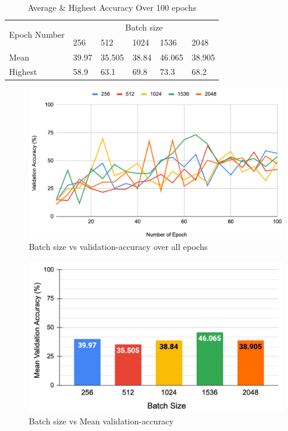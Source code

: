\documentclass[conference]{IEEEtran}
\begin{document}
\begin{table}
     \begin{tabular}{| m{0.75cm} | m{1cm}| m{1cm} | m{1cm} | m{1cm} | m{1cm} |}
     \hline
        \multirow{2}{3em}{Epoch Number} & \multicolumn{5}{|c|}{Batch size}\\ [1ex]
        \cline{2-6}
                     & 256 & 512 & 1024 & 1536 &  2048\\ [1ex]
        \hline\hline
                Mean & 39.97 & 35.505 & 38.84 & 46.065 & 38.905\\ [1ex]
        \hline
                Highest & 58.9 & 63.1 & 69.8 & 73.3 & 68.2\\ [1ex]
      \hline\hline
     \end{tabular}
\caption{\label{table:result_mean_high}Average \& Highest Accuracy Over 100 epochs}
\end{table}

\begin{figure}[htbp]
\centerline{\includegraphics[scale=0.22]{images/bs_acc_all.png}}
\caption{Batch size vs validation-accuracy over all epochs}
\label{fig_result_all}
\end{figure}

\begin{figure}[htbp]
\centerline{\includegraphics[scale=0.22]{images/bs_acc_mean.png}}
\caption{Batch size vs Mean validation-accuracy}
\label{fig_result_mean}
\end{figure}
\end{document}
